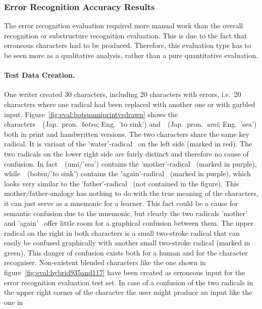 \subsubsection{Error Recognition Accuracy Results}
\label{sec:eval:resulterrorrecognition}

The error recognition evaluation required more manual work than the overall 
recognition or substructure recognition evaluation. This is due to the fact
that erroneous characters had to be produced.
Therefore, this evaluation type has to be seen more as a 
qualitative analysis, rather than a pure quantitative evaluation.

\paragraph{Test Data Creation.}
One writer created 30 characters, including 20 characters with errors,
i.e.\ 20 characters where one radical had been replaced with another one
or with garbled input. Figure~\ref{fig:eval:botsuumiprintvsdrawn} shows the
characters~~(Jap.\ pron.\ \emph{botsu}; Eng.\ 'to sink') %
and~~(Jap.\ pron.\ \emph{umi}; Eng.\ 'sea') %
both in print and handwritten versions.
The two characters share the same key radical. It is variant of the 
'water'-radical~ on the left side (marked in red). 
The two radicals on the lower right side are fairly distinct
and therefore no cause of confusion. In fact~~(umi/'sea') contains the 
'mother'-radical~ (marked in purple), 
while~~(botsu/'to sink') contains the 
'again'-radical~ (marked in purple), 
which looks very similar to the 
'father'-radical~ (not contained in the figure).
This mother/father-analogy has nothing to do with the true meaning
of the characters, it can just serve as a mnemonic for a learner.
This fact could be a cause for semantic confusion due to the 
mnemonic, but clearly the two radicals 
'mother'~ and 'again'~
offer little room for a graphical confusion between them.
The upper radical on the right in both characters is a small two-stroke
radical that can easily be confused graphically with another small two-stroke 
radical (marked in green). This danger of confusion exists both for a human
and for the character recogniser. 
Non-existent blended characters like the one shown in 
figure~\ref{fig:eval:hybrid935and117} have been created as erroneous input
for the error recognition evaluation test set.
In case of a confusion of the two radicals in the upper right corner of 
the character the user might produce an input like the one in 
